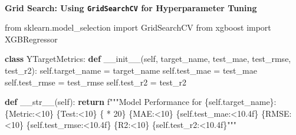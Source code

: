 \documentclass[
  letterpaper,
  DIV=11,
  numbers=noendperiod]{scrartcl}
\makeatletter
\let\oldparagraph\paragraph
\renewcommand{\paragraph}{
    \@ifstar
      \xxxParagraphStar
      \xxxParagraphNoStar
  }
\newcommand{\xxxParagraphStar}[1]{\oldparagraph*{#1}\mbox{}}
\newcommand{\xxxParagraphNoStar}[1]{\oldparagraph{#1}\mbox{}}
\newenvironment{Shaded}{\begin{snugshade}}{\end{snugshade}}
\newcommand{\ControlFlowTok}[1]{\textcolor[rgb]{0.00,0.23,0.31}{\textbf{#1}}}
\newcommand{\DecValTok}[1]{\textcolor[rgb]{0.68,0.00,0.00}{#1}}
\newcommand{\FunctionTok}[1]{\textcolor[rgb]{0.28,0.35,0.67}{#1}}
\newcommand{\ImportTok}[1]{\textcolor[rgb]{0.00,0.46,0.62}{#1}}
\newcommand{\KeywordTok}[1]{\textcolor[rgb]{0.00,0.23,0.31}{\textbf{#1}}}
\newcommand{\NormalTok}[1]{\textcolor[rgb]{0.00,0.23,0.31}{#1}}
\newcommand{\OperatorTok}[1]{\textcolor[rgb]{0.37,0.37,0.37}{#1}}
\newcommand{\SpecialCharTok}[1]{\textcolor[rgb]{0.37,0.37,0.37}{#1}}
\newcommand{\SpecialStringTok}[1]{\textcolor[rgb]{0.13,0.47,0.30}{#1}}
\newcommand{\StringTok}[1]{\textcolor[rgb]{0.13,0.47,0.30}{#1}}
\newcommand{\VariableTok}[1]{\textcolor[rgb]{0.07,0.07,0.07}{#1}}
\makeatother
\begin{document}
\paragraph{\texorpdfstring{\textbf{Grid Search: Using
\texttt{GridSearchCV} for Hyperparameter
Tuning}}{Grid Search: Using GridSearchCV for Hyperparameter Tuning}}\label{grid-search-using-gridsearchcv-for-hyperparameter-tuning}

\begin{Shaded}
\begin{Highlighting}[]
\ImportTok{from}\NormalTok{ sklearn.model\_selection }\ImportTok{import}\NormalTok{ GridSearchCV}
\ImportTok{from}\NormalTok{ xgboost }\ImportTok{import}\NormalTok{ XGBRegressor}

\KeywordTok{class}\NormalTok{ YTargetMetrics:}
    \KeywordTok{def} \FunctionTok{\_\_init\_\_}\NormalTok{(}\VariableTok{self}\NormalTok{, target\_name, test\_mae, test\_rmse, test\_r2):}
        \VariableTok{self}\NormalTok{.target\_name }\OperatorTok{=}\NormalTok{ target\_name}
        \VariableTok{self}\NormalTok{.test\_mae }\OperatorTok{=}\NormalTok{ test\_mae}
        \VariableTok{self}\NormalTok{.test\_rmse }\OperatorTok{=}\NormalTok{ test\_rmse}
        \VariableTok{self}\NormalTok{.test\_r2 }\OperatorTok{=}\NormalTok{ test\_r2}

    \KeywordTok{def} \FunctionTok{\_\_str\_\_}\NormalTok{(}\VariableTok{self}\NormalTok{):}
        \ControlFlowTok{return} \SpecialStringTok{f"""Model Performance for }\SpecialCharTok{\{}\VariableTok{self}\SpecialCharTok{.}\NormalTok{target\_name}\SpecialCharTok{\}}\SpecialStringTok{:}
\SpecialCharTok{\{}\StringTok{\textquotesingle{}Metric\textquotesingle{}}\SpecialCharTok{:\textless{}10\}}\SpecialStringTok{ }\SpecialCharTok{\{}\StringTok{\textquotesingle{}Test\textquotesingle{}}\SpecialCharTok{:\textless{}10\}}
\SpecialCharTok{\{}\StringTok{\textquotesingle{}{-}\textquotesingle{}} \OperatorTok{*} \DecValTok{20}\SpecialCharTok{\}}
\SpecialCharTok{\{}\StringTok{\textquotesingle{}MAE\textquotesingle{}}\SpecialCharTok{:\textless{}10\}}\SpecialStringTok{ }\SpecialCharTok{\{}\VariableTok{self}\SpecialCharTok{.}\NormalTok{test\_mae}\SpecialCharTok{:\textless{}10.4f\}}
\SpecialCharTok{\{}\StringTok{\textquotesingle{}RMSE\textquotesingle{}}\SpecialCharTok{:\textless{}10\}}\SpecialStringTok{ }\SpecialCharTok{\{}\VariableTok{self}\SpecialCharTok{.}\NormalTok{test\_rmse}\SpecialCharTok{:\textless{}10.4f\}}
\SpecialCharTok{\{}\StringTok{\textquotesingle{}R2\textquotesingle{}}\SpecialCharTok{:\textless{}10\}}\SpecialStringTok{ }\SpecialCharTok{\{}\VariableTok{self}\SpecialCharTok{.}\NormalTok{test\_r2}\SpecialCharTok{:\textless{}10.4f\}}\SpecialStringTok{"""}


\end{Highlighting}
\end{Shaded}
\end{document}

